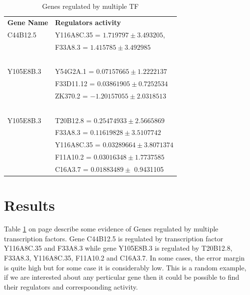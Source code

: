 \documentclass[a4paper,10pt]{report}
\begin{document}
\begin{table}[!htdp]
  \begin{tabular}{l l }
	      \textbf{Gene Name} & \textbf{Regulators activity} \\
	      {\color{red}C44B12.5} & {\color{blue} Y116A8C.35 }= $ 1.719797 \pm 3.493205 $, \\ 
				    & {\color{blue}F33A8.3} = $ 1.415785 \pm 3.492985$ \\~\\

		{\color{red}Y105E8B.3} & {\color{blue} Y54G2A.1} = $ 0.07157665 \pm 1.2222137 $ \\
		  & {\color{blue} F33D11.12} = $ 0.03861905 \pm 0.7252534 $ \\
 		  & {\color{blue} ZK370.2} = $ -1.20157055 \pm  2.0318513 $\\~\\
		    
	      {\color{red} Y105E8B.3} & {\color{blue} T20B12.8 } = $ 0.25474933 \pm  2.5665869 $ \\
		  			& {\color{blue} F33A8.3 } = $ 0.11619828  \pm  3.5107742 $ \\
 		  			& {\color{blue} Y116A8C.35 } = $ 0.03289664 \pm  3.8071374 $ \\
					& {\color{blue} F11A10.2 } = $ 0.03016348 \pm 1.7737585 $ \\
 		  			& {\color{blue} C16A3.7  } = $ 0.01883489 \pm  $ 0.9431105\\
  \end{tabular}
  \caption{Genes regulated by multiple TF}
  \label{table:gene_regulation}
\end{table}


\section{Results}\label{results}

Table \ref{table:gene_regulation} on page \pageref{table:gene_regulation} describe some evidence of Genes regulated by multiple transcription
factors. Gene C44B12.5 is regulated by transcription factor Y116A8C.35 and F33A8.3 while gene Y105E8B.3 is 
regulated by T20B12.8, F33A8.3, Y116A8C.35, F11A10.2 and C16A3.7. In some cases, the error margin is quite 
high but for some case it is considerably low. This is a random example, if we are interested about any
perticular gene then it could be possible to find their regulators and correspoonding activity.
\end{document}
